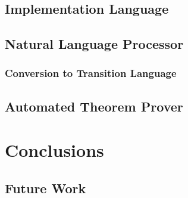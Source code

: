 \documentclass[12pt]{article}
\begin{document}
\subsection{Implementation Language}
\subsection{Natural Language Processor}
\subsubsection{Conversion to Transition Language}
\subsection{Automated Theorem Prover}

\section{Conclusions}
\subsection{Future Work}

\end{document}
